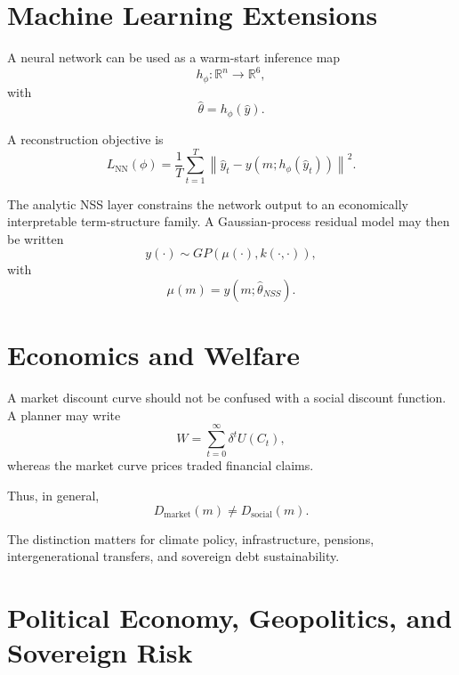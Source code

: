 \documentclass[a4paper,10pt]{article}
\theoremstyle{remark}
\begin{document}
\section{Machine Learning Extensions}

A neural network can be used as a warm-start inference map
\begin{equation}
h_\phi:\mathbb{R}^n\rightarrow\mathbb{R}^6,
\end{equation}
with
\begin{equation}
\hat\theta=h_\phi(\hat y).
\end{equation}

A reconstruction objective is
\begin{equation}
L_{\mathrm{NN}}(\phi)
=\frac{1}{T}\sum_{t=1}^{T}
\left\|\hat y_t-y(m;h_\phi(\hat y_t))\right\|^2.
\end{equation}

The analytic NSS layer constrains the network output to an economically interpretable term-structure family. A Gaussian-process residual model may then be written
\begin{equation}
y(\cdot)\sim GP(\mu(\cdot),k(\cdot,\cdot)),
\end{equation}
with
\begin{equation}
\mu(m)=y(m;\hat\theta_{NSS}).
\end{equation}

\section{Economics and Welfare}

A market discount curve should not be confused with a social discount function. A planner may write
\begin{equation}
W=\sum_{t=0}^{\infty}\delta^t U(C_t),
\end{equation}
whereas the market curve prices traded financial claims.

Thus, in general,
\begin{equation}
D_{\mathrm{market}}(m)\neq D_{\mathrm{social}}(m).
\end{equation}

The distinction matters for climate policy, infrastructure, pensions, intergenerational transfers, and sovereign debt sustainability.

\section{Political Economy, Geopolitics, and Sovereign Risk}
\end{document}
